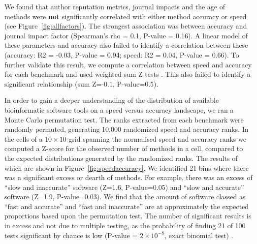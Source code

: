 \documentclass[fleqn,10pt]{SelfArx} %
\begin{document}
We found that author reputation metrics, journal impacts and the age of methods were \textbf{not} significantly correlated with either method accuracy or speed (see Figure~\ref{fig:allfactors}). The strongest association was between accuracy and journal impact factor (Spearman’s rho = 0.1, P-value = 0.16). A linear model of these parameters and accuracy also failed to identify a correlation between these (accuracy: R2 = -0.03, P-value = 0.94; speed: R2 = 0.04, P-value = 0.66). To further validate this result, we compute a correlation between speed and accuracy for each benchmark and used weighted sum Z-tests \cite{Zaykin2011-tj}. This also failed to identify a significant relationship (sum Z=-0.1, P-value=0.5).

In order to gain a deeper understanding of the distribution of available bioinformatic software tools on a speed versus accuracy landscape, we ran a Monte Carlo permutation test. The ranks extracted from each benchmark were randomly permuted, generating 10,000 randomized speed and accuracy ranks. In the cells of a $10\times10$ grid spanning the normalised speed and accuracy ranks we computed a Z-score for the observed number of methods in a cell, compared to the expected distributions generated by the randomized ranks. The results of which are shown in Figure~\ref{fig:speedaccuracy}. We identified 21 bins where there was a significant excess or dearth of methods. For example, there was an excess of “slow and inaccurate” software (Z=1.6, P-value=0.05) and “slow and accurate” software (Z=1.9, P-value=0.03). We find that the amount of software classed as “fast and accurate” and “fast and inaccurate” are at approximately the expected proportions based upon the permutation test. The number of significant results is in excess and not due to multiple testing, as the probability of finding 21 of 100 tests significant by chance is low (P-value = $2\times 10^{-8}$, exact binomial test) \cite{Moran2003-ve}.
\end{document}
